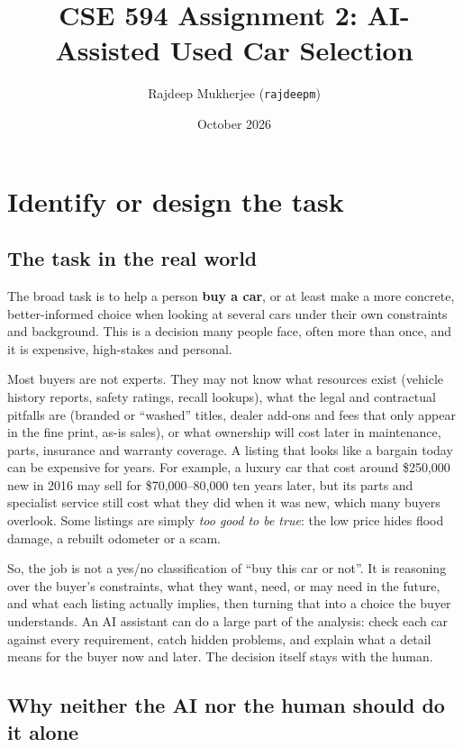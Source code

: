\documentclass[11pt]{article}
\title{\textbf{CSE 594 Assignment 2: AI-Assisted Used Car Selection}}
\author{Rajdeep Mukherjee (\texttt{rajdeepm})}
\date{October 2026}
\begin{document}
\maketitle

\section{Identify or design the task}\label{part:task}

\subsection{The task in the real world}

The broad task is to help a person \textbf{buy a car}, or at least make a more concrete,
better-informed choice when looking at several cars under their own constraints and background.
This is a decision many people face, often more than once, and it is expensive, high-stakes and
personal.

Most buyers are not experts. They may not know what resources exist (vehicle history reports,
safety ratings, recall lookups), what the legal and contractual pitfalls are (branded or
``washed'' titles, dealer add-ons and fees that only appear in the fine print, as-is sales), or
what ownership will cost later in maintenance, parts, insurance and warranty coverage. A listing
that looks like a bargain today can be expensive for years. For example, a luxury car that cost
around \$250,000 new in 2016 may sell for \$70,000--80,000 ten years later, but its parts and
specialist service still cost what they did when it was new, which many buyers overlook. Some
listings are simply \emph{too good to be true}: the low price hides flood damage, a rebuilt
odometer or a scam.

So, the job is not a yes/no classification of ``buy this car or not''. It is reasoning over the
buyer's constraints, what they want, need, or may need in the future, and what each listing
actually implies, then turning that into a choice the buyer understands. An AI assistant can do a
large part of the analysis: check each car against every requirement, catch hidden problems, and
explain what a detail means for the buyer now and later. The decision itself stays with the human.

\subsection{Why neither the AI nor the human should do it alone}
\end{document}
